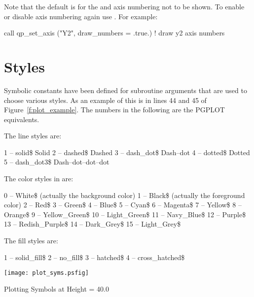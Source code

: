 Note that the default is for the  and  axis numbering
not to be shown. To enable or disable axis numbering again use
. For example:
\begin{example}
  call qp_set_axis ("Y2", draw_numbers = .true.)  ! draw y2 axis numbers
\end{example}

\section{Styles}
\label{s:styles}

Symbolic constants have been defined for \quickplot subroutine
arguments that are used to choose various styles. As an example of
this is in lines 44 and 45 of Figure~\ref{f:plot_example}. The
numbers in the following are the PGPLOT equivalents.

The \quickplot line styles are:
\begin{example}
    1 -- solid\$                  Solid
    2 -- dashed\$                 Dashed
    3 -- dash_dot\$               Dash--dot 
    4 -- dotted\$                 Dotted
    5 -- dash_dot3\$              Dash--dot--dot--dot        
\end{example}

The color styles in \quickplot are:
\begin{example}
    0 -- White\$   (actually the background color)
    1 -- Black\$   (actually the foreground color)
    2 -- Red\$
    3 -- Green\$
    4 -- Blue\$
    5 -- Cyan\$
    6 -- Magenta\$
    7 -- Yellow\$ 
    8 -- Orange\$
    9 -- Yellow_Green\$
   10 -- Light_Green\$
   11 -- Navy_Blue\$
   12 -- Purple\$
   13 -- Redish_Purple\$
   14 -- Dark_Grey\$
   15 -- Light_Grey\$
\end{example}

The fill styles are:
\begin{example}
    1 -- solid_fill\$        
    2 -- no_fill\$           
    3 -- hatched\$           
    4 -- cross_hatched\$     
\end{example}

\begin{table}
  \centering
  \texttt{[image: plot\_syms.psfig]}
  \caption{Plotting Symbols at Height = 40.0}
  \label{t:plot_syms}
\end{table}

